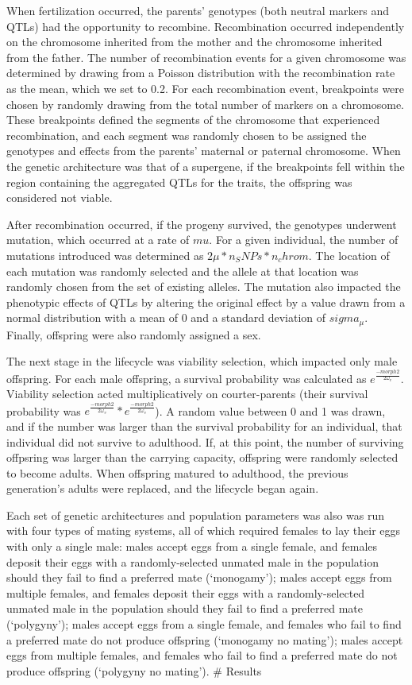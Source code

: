 \documentclass[11pt,]{article}
\begin{document}
When fertilization occurred, the parents' genotypes (both neutral
markers and QTLs) had the opportunity to recombine. Recombination
occurred independently on the chromosome inherited from the mother and
the chromosome inherited from the father. The number of recombination
events for a given chromosome was determined by drawing from a Poisson
distribution with the recombination rate as the mean, which we set to
0.2. For each recombination event, breakpoints were chosen by randomly
drawing from the total number of markers on a chromosome. These
breakpoints defined the segments of the chromosome that experienced
recombination, and each segment was randomly chosen to be assigned the
genotypes and effects from the parents' maternal or paternal chromosome.
When the genetic architecture was that of a supergene, if the
breakpoints fell within the region containing the aggregated QTLs for
the traits, the offspring was considered not viable.

After recombination occurred, if the progeny survived, the genotypes
underwent mutation, which occurred at a rate of \(mu\). For a given
individual, the number of mutations introduced was determined as
\(2\mu*n_SNPs*n_chrom\). The location of each mutation was randomly
selected and the allele at that location was randomly chosen from the
set of existing alleles. The mutation also impacted the phenotypic
effects of QTLs by altering the original effect by a value drawn from a
normal distribution with a mean of 0 and a standard deviation of
\(sigma_\mu\). Finally, offspring were also randomly assigned a sex.

The next stage in the lifecycle was viability selection, which impacted
only male offspring. For each male offspring, a survival probability was
calculated as \(e^{\frac{-morph2}{2\omega_v}}\). Viability selection acted
multiplicatively on courter-parents (their survival probability was
\(e^{\frac{-morph2}{2\omega_v}}*e^{\frac{-morph2}{2\omega_v}}\)). A random
value between 0 and 1 was drawn, and if the number was larger than the
survival probability for an individual, that individual did not survive
to adulthood. If, at this point, the number of surviving offpsring was
larger than the carrying capacity, offspring were randomly selected to
become adults. When offspring matured to adulthood, the previous
generation's adults were replaced, and the lifecycle began again.

Each set of genetic architectures and population parameters was also was run with four types of mating systems, all of which required females to lay their eggs with only a single male: males accept eggs from a single female, and females deposit their eggs with a randomly-selected unmated male in the population should they fail to find a preferred mate (`monogamy'); males accept eggs from multiple females, and females deposit their eggs with a randomly-selected unmated male in the population should they fail to find a preferred mate (`polygyny'); males accept eggs from a single female, and females who fail to find a preferred mate do not produce offspring (`monogamy no mating'); males accept eggs from multiple females, and females who fail to find a preferred mate do not produce offspring (`polygyny no mating').
\# Results
\end{document}
